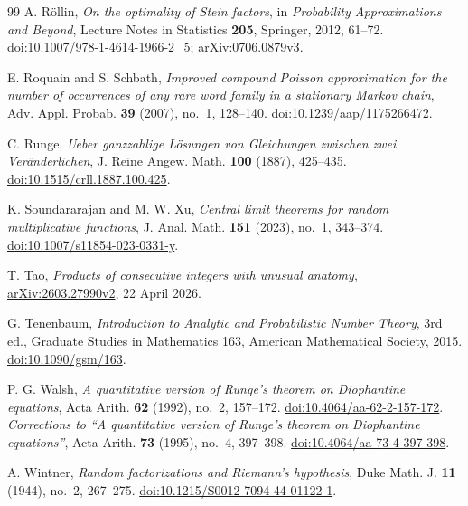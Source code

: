 \begin{thebibliography}{99}
A. R\"ollin,
\emph{On the optimality of Stein factors},
in \emph{Probability Approximations and Beyond}, Lecture Notes in Statistics
\textbf{205}, Springer, 2012, 61--72.
\href{https://doi.org/10.1007/978-1-4614-1966-2_5}{doi:10.1007/978-1-4614-1966-2\_5};
\href{https://arxiv.org/abs/0706.0879v3}{arXiv:0706.0879v3}.

E. Roquain and S. Schbath,
\emph{Improved compound Poisson approximation for the number of occurrences of any rare word family in a stationary Markov chain},
Adv. Appl. Probab. \textbf{39} (2007), no.~1, 128--140.
\href{https://doi.org/10.1239/aap/1175266472}{doi:10.1239/aap/1175266472}.

C. Runge,
\emph{Ueber ganzzahlige Lösungen von Gleichungen zwischen zwei Veränderlichen},
J. Reine Angew. Math. \textbf{100} (1887), 425--435.
\href{https://doi.org/10.1515/crll.1887.100.425}{doi:10.1515/crll.1887.100.425}.

K. Soundararajan and M. W. Xu,
\emph{Central limit theorems for random multiplicative functions},
J. Anal. Math. \textbf{151} (2023), no.~1, 343--374.
\href{https://doi.org/10.1007/s11854-023-0331-y}{doi:10.1007/s11854-023-0331-y}.

T. Tao,
\emph{Products of consecutive integers with unusual anatomy},
\href{https://arxiv.org/abs/2603.27990v2}{arXiv:2603.27990v2}, 22 April 2026.

G. Tenenbaum,
\emph{Introduction to Analytic and Probabilistic Number Theory},
3rd ed., Graduate Studies in Mathematics 163, American Mathematical Society, 2015.
\href{https://doi.org/10.1090/gsm/163}{doi:10.1090/gsm/163}.

P. G. Walsh,
\emph{A quantitative version of Runge's theorem on Diophantine equations},
Acta Arith. \textbf{62} (1992), no.~2, 157--172.
\href{https://doi.org/10.4064/aa-62-2-157-172}{doi:10.4064/aa-62-2-157-172}.
\emph{Corrections to ``A quantitative version of Runge's theorem on Diophantine equations''},
Acta Arith. \textbf{73} (1995), no.~4, 397--398.
\href{https://doi.org/10.4064/aa-73-4-397-398}{doi:10.4064/aa-73-4-397-398}.

A. Wintner,
\emph{Random factorizations and Riemann's hypothesis},
Duke Math. J. \textbf{11} (1944), no.~2, 267--275.
\href{https://doi.org/10.1215/S0012-7094-44-01122-1}{doi:10.1215/S0012-7094-44-01122-1}.

\end{thebibliography}
